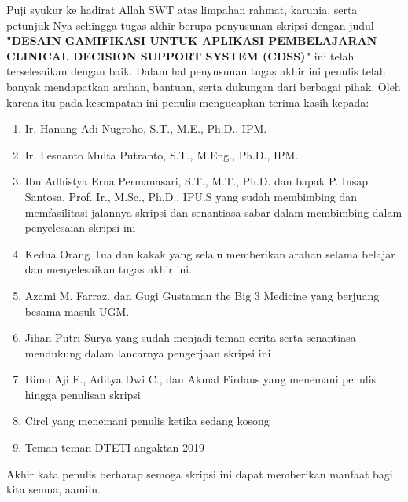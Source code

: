 
Puji syukur ke hadirat Allah SWT atas limpahan rahmat, karunia, serta petunjuk-Nya sehingga tugas akhir berupa penyusunan skripsi 
dengan judul \textbf{"DESAIN GAMIFIKASI UNTUK APLIKASI PEMBELAJARAN CLINICAL DECISION SUPPORT SYSTEM (CDSS)"}
ini telah terselesaikan dengan baik. Dalam hal penyusunan tugas akhir ini penulis telah banyak mendapatkan arahan, bantuan, serta dukungan dari berbagai pihak. 
Oleh karena itu pada kesempatan ini penulis mengucapkan terima kasih kepada:

\begin{enumerate}
	\item Ir. Hanung Adi Nugroho, S.T., M.E., Ph.D., IPM.
	\item Ir. Lesnanto Multa Putranto, S.T., M.Eng., Ph.D., IPM.
	\item Ibu Adhistya Erna Permanasari, S.T., M.T., Ph.D. dan bapak P. Insap Santosa, Prof. Ir., M.Sc., Ph.D., IPU.S yang sudah membimbing dan memfasilitasi jalannya skripsi dan senantiasa sabar dalam membimbing dalam penyelesaian skripsi ini
	\item Kedua Orang Tua dan kakak yang selalu memberikan arahan selama belajar dan menyelesaikan tugas akhir ini.
	\item Azami M. Farraz. dan Gugi Gustaman the Big 3 Medicine yang berjuang besama masuk UGM.
	\item Jihan Putri Surya yang sudah menjadi teman cerita serta senantiasa mendukung dalam lancarnya pengerjaan skripsi ini 
	\item Bimo Aji F., Aditya Dwi C., dan Akmal Firdaus yang menemani penulis hingga penulisan skripsi
	\item Circl yang menemani penulis ketika sedang kosong
	\item Teman-teman DTETI angaktan 2019
\end{enumerate}

Akhir kata penulis berharap semoga skripsi ini dapat memberikan manfaat bagi kita semua, aamiin.


